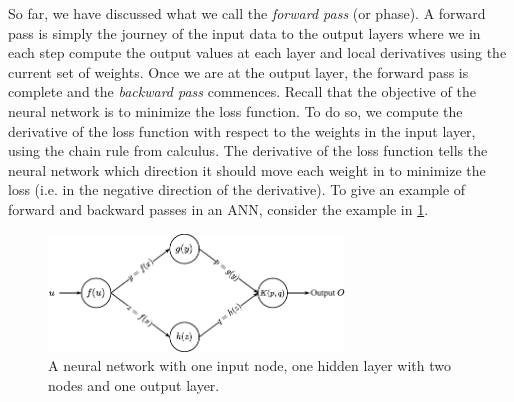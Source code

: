 So far, we have discussed what we call the \textit{forward pass} (or phase). A forward pass is simply the journey of the input data to the output layers where we in each step compute the output values at each layer and local derivatives using the current set of weights. Once we are at the output layer, the forward pass is complete and the \textit{backward pass} commences. Recall that the objective of the neural network is to minimize the loss function. To do so, we compute the derivative of the loss function with respect to the weights in the input layer, using the chain rule from calculus. The derivative of the loss function tells the neural network which direction it should move each weight in to minimize the loss (i.e. in the negative direction of the derivative). To give an example of forward and backward passes in an ANN, consider the example in \cref{fig:neural-network-example-backprop}.
\begin{figure}[H]
    \centering
    \includegraphics[width=0.7\textwidth]{thesis/figures/artificial-neural-network-backprop-example_cropped.pdf}
    \caption{A neural network with one input node, one hidden layer with two nodes and one output layer.}
    \label{fig:neural-network-example-backprop}
\end{figure}

